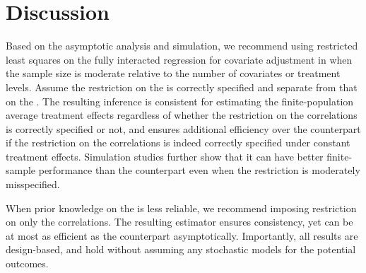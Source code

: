 \documentclass[11pt]{article}
\theoremstyle{definition}
\begin{document}
\section{Discussion}
Based on the asymptotic analysis and simulation, we recommend using restricted least squares on the fully interacted regression  for covariate adjustment in \mess when the sample size is  moderate relative to the number of covariates or treatment levels. 
%
Assume the restriction on the {\apo} is correctly specified and separate from that on the {\cpoc}. 
The resulting inference is consistent for estimating the finite-population average treatment effects regardless of whether the restriction on the correlations is correctly specified or not, and ensures additional efficiency over the \olss counterpart 
if the restriction on the correlations is indeed correctly specified under constant treatment effects. 
Simulation studies further show that it can have better finite-sample performance than the \olss counterpart even when the restriction is moderately misspecified.  

When prior knowledge on the {\apo} is less reliable, we recommend imposing restriction on only the correlations. The resulting estimator ensures consistency, yet can be at most as efficient as the \olss counterpart asymptotically. 
Importantly, all results are design-based, and hold without assuming any stochastic models for the potential outcomes.





 







\newpage
\setcounter{equation}{0}
\setcounter{section}{0}
\setcounter{figure}{0}
\setcounter{example}{0}
\setcounter{proposition}{0}
\setcounter{corollary}{0}
\setcounter{theorem}{0}
\setcounter{table}{0}
\setcounter{condition}{0}
\setcounter{lemma}{0}
\setcounter{remark}{0}



\renewcommand {\theproposition} {S\arabic{proposition}}
\renewcommand {\theexample} {S\arabic{example}}
\renewcommand {\thefigure} {S\arabic{figure}}
\renewcommand {\thetable} {S\arabic{table}}
\renewcommand {\theequation} {S\arabic{equation}}
\renewcommand {\thelemma} {S\arabic{lemma}}
\renewcommand {\thesection} {S\arabic{section}}
\renewcommand {\thetheorem} {S\arabic{theorem}}
\renewcommand {\thecorollary} {S\arabic{corollary}}
\renewcommand {\thecondition} {S\arabic{condition}}
\renewcommand {\thepage} {S\arabic{page}}
\renewcommand {\theremark} {S\arabic{remark}}
\end{document}
